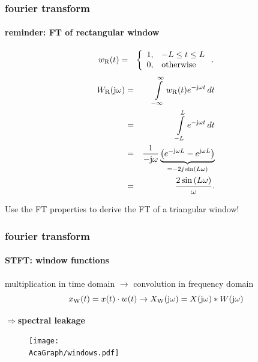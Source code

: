 	\begin{frame}\frametitle{fourier transform}\framesubtitle{reminder: FT of rectangular window}
        \vspace{-8mm}
        \begin{footnotesize}
        \begin{eqnarray}
            w_{\mathrm{R}}(t)	&=& \left\lbrace  
                        \begin{array}{ll} 
                                                    1, & -L \leq t \leq L\\ 
                          \vphantom{\frac{1}{1}} 	0, & \text{otherwise} \\ 
                        \end{array} 
                        \right. .
        \end{eqnarray}
\pause
        \begin{eqnarray}
            W_{\mathrm{R}}(\mathrm{j}\omega) 	&=& \int\limits_{-\infty}^{\infty} {w_{\mathrm{R}}(t){e}^{-\mathrm{j}\omega t}\,dt}\nonumber\\
                        &=& \int\limits_{-L}^{L} {{e}^{-\mathrm{j}\omega t}\,dt}\nonumber\\
                        &=& \frac{1}{-\mathrm{j}\omega} \underbrace{\left({e}^{-\mathrm{j}{\omega L}}-{e}^{\mathrm{j}{\omega L}}\right)}_{= -2j\sin\left({L\omega}\right)}\nonumber\\
                        &=& \frac{2\sin\left({L\omega}\right)}{{\omega}}  .
        \end{eqnarray}
        \end{footnotesize}
        \pause
        Use the FT properties to derive the FT of a triangular window!
	\end{frame}	

	\begin{frame}\frametitle{fourier transform}\framesubtitle{STFT: window functions}
		multiplication in time domain $\rightarrow$ convolution in frequency domain
        \begin{equation*}
            x_\mathrm{W}(t) = x(t)\cdot w(t) \rightarrow X_\mathrm{W}(\mathrm{j}\omega) = X(\mathrm{j}\omega) \ast W(\mathrm{j}\omega)
        \end{equation*}

		\pause		
		$\Rightarrow$\textbf{spectral leakage}
		\begin{figure}
			\centering
				\texttt{[image: \\AcaGraph/windows.pdf]}
			\label{fig:windows}
		\end{figure}
	\end{frame}	

